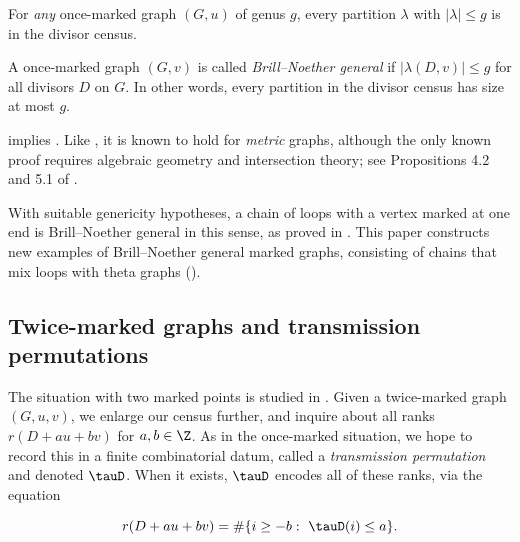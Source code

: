 \begin{conjecture}\label{conj:bnOnceMarked}
For \emph{any} once-marked graph $(G,u)$ of genus $g$, every partition $\lambda$ with $|\lambda| \leq g$ is in the divisor census. 
\end{conjecture}

\begin{defi}
A once-marked graph $(G,v)$ is called \emph{Brill--Noether general} if $|\lambda(D,v)| \leq g$ for all divisors $D$ on $G$. In other words, every partition in the divisor census has size at most $g$.
\end{defi}

 implies . Like , it is known to hold for \emph{metric} graphs, although the only known proof requires algebraic geometry and intersection theory; see Propositions 4.2 and 5.1 of \cite{Pfl17}.

With suitable genericity hypotheses, a chain of loops with a vertex marked at one end is Brill--Noether general in this sense, as proved in \cite{Pfl17}. This paper constructs new examples of Brill--Noether general marked graphs, consisting of chains that mix loops with theta graphs ().


\subsection{Twice-marked graphs and transmission permutations}

The situation with two marked points is studied in \cite{Pfl22}. Given a twice-marked graph $(G,u,v)$, we enlarge our census further, and inquire about all ranks $r(D+au+bv)$ for $a,b \in \Z$. As in the once-marked situation, we hope to record this in a finite combinatorial datum, called a \emph{transmission permutation} and denoted $\tauD$. When it exists, $\tauD$ encodes all of these ranks, via the equation

\begin{equation}\label{eq-tauDIntroDefn}
    r(D + au + bv) = \# \{ i \geq -b:\ \tauD(i) \leq a \}.
\end{equation}

